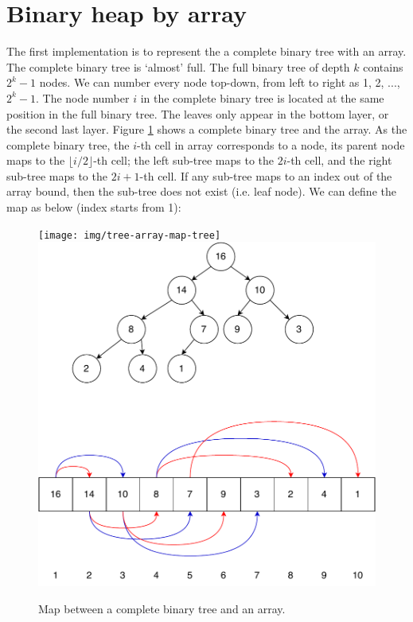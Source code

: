 \documentclass[b5paper]{article}
\begin{document}
\section{Binary heap by array}
\label{ibheap}  

The first implementation is to represent the a complete binary tree with an array. The complete binary tree is `almost' full. The full binary tree of depth $k$ contains $2^k - 1$ nodes. We can number every node top-down, from left to right as 1, 2, ..., $2^k -1$. The node number $i$ in the complete binary tree is located at the same position in the full binary tree. The leaves only appear in the bottom layer, or the second last layer. Figure \ref{fig:tree-array-map} shows a complete binary tree and the array. As the complete binary tree, the $i$-th cell in array corresponds to a node, its parent node maps to the $\lfloor i/2 \rfloor$-th cell; the left sub-tree maps to the $2i$-th cell, and the right sub-tree maps to the $2i + 1$-th cell. If any sub-tree maps to an index out of the array bound, then the sub-tree does not exist (i.e. leaf node). We can define the map as below (index starts from 1):

\begin{figure}[htbp]
\centering
   \texttt{[image: img/tree-array-map-tree]}
   \includegraphics[scale=0.5]{img/binary-tree-in-array}
 \caption{Map between a complete binary tree and an array.} \label{fig:tree-array-map}
\end{figure}
\end{document}
